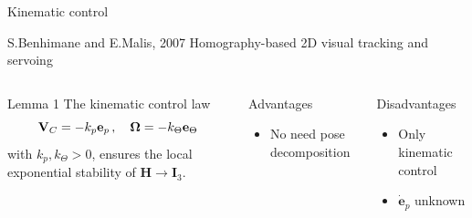 \documentclass{beamer}
\begin{document}
\begin{frame}{Kinematic control}
	\begin{block}{S.Benhimane and E.Malis, 2007}
		Homography-based 2D visual tracking and servoing
	\end{block}
	\begin{columns}
		\begin{block}{Lemma 1}
			The kinematic control law
			\vspace{-0.2cm}
			\begin{equation*}\label{maliscontrol}
			\mathbf{V}_{C} = -k_p \mathbf{e}_p\,,\quad \mathbf{\Omega} = -k_\Theta \mathbf{e}_\Theta 
			\vspace{-0.2cm} 
			\end{equation*}
			with $k_p, k_\Theta>0$, ensures the local exponential stability of $\mathbf{H}  \longrightarrow \mathbf{I}_3$.
		\end{block}
		\begin{block}{Advantages}
			\begin{itemize}
				\item No need pose decomposition				
			\end{itemize}
		\end{block}
		
		\begin{block}{Disadvantages}
			\begin{itemize}
				\item Only kinematic control
				\item $\dot{\mathbf{e}}_p$ unknown
			\end{itemize}
		\end{block}
	\end{columns}
\end{frame}
\end{document}
